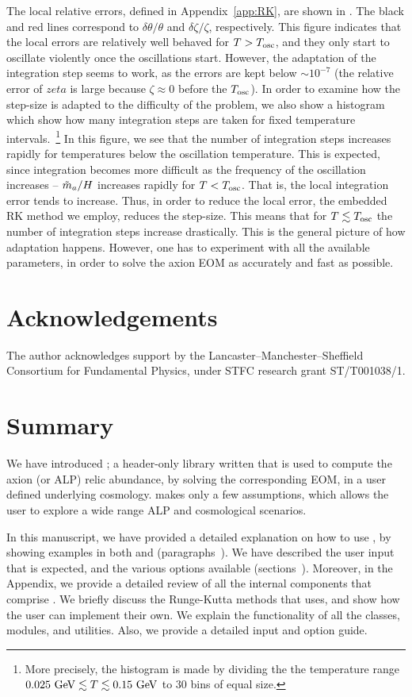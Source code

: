 \documentclass[11pt,a4paper]{article}
\begin{document}
%
The local relative errors, defined in Appendix~\ref{app:RK}, are shown in . The black and red lines correspond to $\delta \theta/\theta$ and $\delta \zeta/\zeta$, respectively. This figure indicates that the local errors are relatively well behaved for $T>T_{\rm osc}{}$, and they only start to oscillate violently once the oscillations start. However, the adaptation of the integration step seems to work, as the errors are kept below $\sim 10^{-7}$ (the relative error of $zeta$ is large because $\zeta \approx 0$ before the $T_{\rm osc}{}$).  In order to examine how the step-size is adapted to the difficulty of the problem, we also show a histogram which show how many integration steps are taken for fixed temperature intervals.~\footnote{More precisely, the histogram is made by dividing the the temperature range $0.025~{\rm GeV}\lesssim T\lesssim 0.15~{\rm GeV}$ to $30$ bins of equal size.} 
%
In this figure, we see that the number of integration steps increases rapidly for temperatures below the oscillation temperature. 
%
This is expected, since integration becomes more difficult as the frequency of the oscillation increases -- $\tilde m_{a}{}/H$ increases rapidly for $T<T_{\rm osc}{}$. That is, the local integration error tends to increase. Thus, in order to reduce the local error, the embedded RK method we employ, reduces the step-size. This means that for $T \lesssim T_{\rm osc}{}$ the number of integration steps increase drastically.
%
This is the general picture of how adaptation happens. However, one has to experiment with all the available parameters, in order to solve the axion EOM as accurately and fast as possible.  

\section{Acknowledgements}
%
The author acknowledges support by the Lancaster–Manchester–Sheffield Consortium for Fundamental Physics, under STFC research grant ST/T001038/1.


\section{Summary}
%
We have introduced \mimes; a header-only library written \CPP that is used to compute the axion (or ALP) relic abundance, by solving the corresponding EOM, in a user defined underlying cosmology. \mimes makes only a few assumptions, which allows the user to explore a wide range ALP and cosmological scenarios. 

In this manuscript, we have provided a detailed explanation on how to use \mimes, by showing examples in both \CPP and \PY (paragraphs~). We have described the user input that is expected, and the various options available (sections~). Moreover, in the Appendix, we provide a detailed review of all the internal components that comprise \mimes. We briefly discuss the Runge-Kutta methods that \mimes uses, and show how the user can implement their own. We explain the functionality of all the classes, modules, and utilities. Also, we provide a detailed input and option guide.
\end{document}
